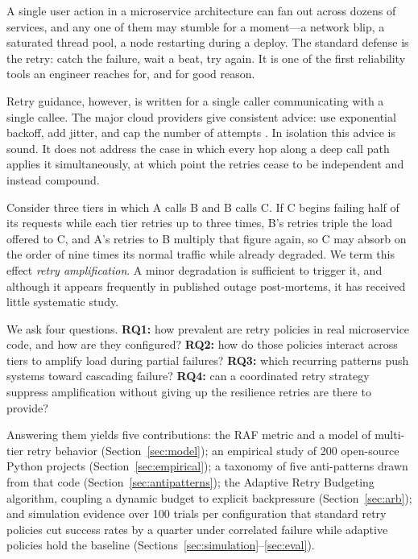 \documentclass[conference]{IEEEtran}
\begin{document}
A single user action in a microservice architecture can fan out across dozens of services, and any one of them may stumble for a moment---a network blip, a saturated thread pool, a node restarting during a deploy. The standard defense is the retry: catch the failure, wait a beat, try again. It is one of the first reliability tools an engineer reaches for, and for good reason.

Retry guidance, however, is written for a single caller communicating with a single callee. The major cloud providers give consistent advice: use exponential backoff, add jitter, and cap the number of attempts \cite{aws_backoff, google_retry, azure_retry}. In isolation this advice is sound. It does not address the case in which every hop along a deep call path applies it simultaneously, at which point the retries cease to be independent and instead compound.

Consider three tiers in which A calls B and B calls C. If C begins failing half of its requests while each tier retries up to three times, B's retries triple the load offered to C, and A's retries to B multiply that figure again, so C may absorb on the order of nine times its normal traffic while already degraded. We term this effect \textit{retry amplification}. A minor degradation is sufficient to trigger it, and although it appears frequently in published outage post-mortems, it has received little systematic study.

We ask four questions. \textbf{RQ1:} how prevalent are retry policies in real microservice code, and how are they configured? \textbf{RQ2:} how do those policies interact across tiers to amplify load during partial failures? \textbf{RQ3:} which recurring patterns push systems toward cascading failure? \textbf{RQ4:} can a coordinated retry strategy suppress amplification without giving up the resilience retries are there to provide?

Answering them yields five contributions: the RAF metric and a model of multi-tier retry behavior (Section~\ref{sec:model}); an empirical study of 200 open-source Python projects (Section~\ref{sec:empirical}); a taxonomy of five anti-patterns drawn from that code (Section~\ref{sec:antipatterns}); the Adaptive Retry Budgeting algorithm, coupling a dynamic budget to explicit backpressure (Section~\ref{sec:arb}); and simulation evidence over 100 trials per configuration that standard retry policies cut success rates by a quarter under correlated failure while adaptive policies hold the baseline (Sections~\ref{sec:simulation}--\ref{sec:eval}).
\end{document}
